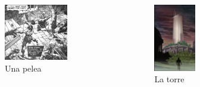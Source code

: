 \begin{frame}{}
\begin{columns}
    \begin{figure}[htb]
    \centering
        \includegraphics[width=0.7\textwidth]{img/res/05}
        \caption{Una pelea}
    \end{figure}    
    \begin{figure}[htb]
    \centering
        \includegraphics[width=0.4\textwidth]{img/res/06}
        \caption{La torre}
    \end{figure}    
\end{columns}
\end{frame}

